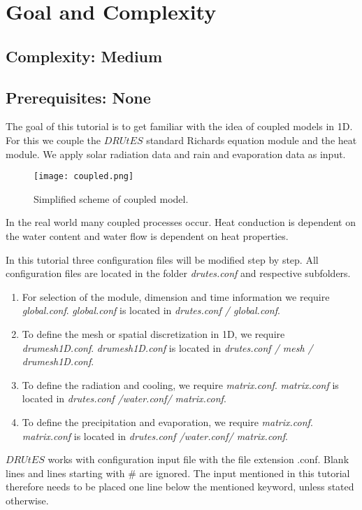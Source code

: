 \documentclass[
10pt, %
a4paper, %
oneside, %
headinclude,footinclude, %
BCOR5mm, %
]{scrartcl}
\begin{document}
\section{Goal and Complexity}
\subsection*{Complexity: Medium}

\subsection*{Prerequisites: None}

The goal of this tutorial is to get familiar with the idea of coupled models in 1D. For this we couple the $DRUtES$ standard Richards equation module and the heat module. We apply solar radiation data and rain and evaporation data as input.

\begin{figure}[!h]
\centering
\texttt{[image: coupled.png]}
\caption{Simplified scheme of coupled model.}
\end{figure}

In the real world many coupled processes occur. Heat conduction is dependent on the water content and water flow is dependent on heat properties. 

In this tutorial three configuration files will be modified step by step. All configuration files are located in the folder \emph{drutes.conf} and respective subfolders. \begin{enumerate}
\item For selection of the module, dimension and time information we require \emph{global.conf}.  \emph{global.conf} is located in \emph{drutes.conf / global.conf}. 
\item To define the mesh or spatial discretization in 1D,  we require \emph{drumesh1D.conf}. \emph{drumesh1D.conf} is located in \emph{drutes.conf / mesh / drumesh1D.conf}. 
\item To define the radiation and cooling, we require \emph{matrix.conf}. \emph{matrix.conf} is located in \emph{drutes.conf /water.conf/ matrix.conf}. 
\item To define the precipitation and evaporation, we require \emph{matrix.conf}. \emph{matrix.conf} is located in \emph{drutes.conf /water.conf/ matrix.conf}. 
\end{enumerate}
$DRUtES$ works with configuration input file with the file extension .conf. Blank lines and lines starting with \# are ignored. The input mentioned in this tutorial therefore needs to be placed one line below the mentioned keyword, unless stated otherwise. 
\end{document}
